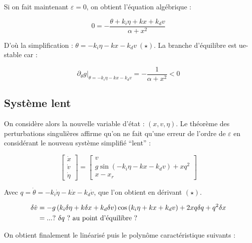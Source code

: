 \documentclass[10pt]{article}
\begin{document}
\noindent Si on fait maintenant $\varepsilon = 0$, on obtient l'équation algébrique :

\[
	0 = - \frac{\theta + k_i \eta + k x + k_d v}{\alpha + x^2}
\]

\noindent D'où la simplification :  $\theta = - k_i \eta - k x - k_d v \ (\star)$. La branche d'équilibre est ue-stable car :

\[
	\partial_{\theta} g |_{\theta = - k_i \eta - k x - k_d v} = - \frac{1}{\alpha + x^2} < 0
\]

\subsection*{Système lent}

\noindent On considère alors la nouvelle variable d'état : $(x, v, \eta)$. Le théorème des
perturbations singulières affirme qu'on ne fait qu'une erreur de l'ordre de $\varepsilon$
en considérant le nouveau système simplifié ``lent'' :

\[
	 \begin{bmatrix}
	 	\dot x \\
		\dot v \\
		\dot \eta
	\end{bmatrix} =
	\begin{bmatrix}
	 	v \\
		g \sin \left( - k_i \eta - k x - k_d v \right) + x q^2 \\
		x - x_r
	\end{bmatrix}
\]

\noindent Avec $q = \dot \theta = - k_i \dot \eta - k \dot x - k_d \dot v$, que l'on obtient en dérivant $(\star)$.

\begin{align}
	\delta \dot v &= - g \left( k_i \delta \eta + k \delta x + k_d \delta v \right) \cos \left( k_i \eta + k x + k_d v \right) +
	2 x q \delta q + q^2 \delta x \notag \\
	&= ... ? \ \delta q \ ? \text{ au point d'équilibre } ? \notag
\end{align}

\noindent On obtient finalement le linéarisé puis le polynôme caractéristique suivants :
\end{document}
